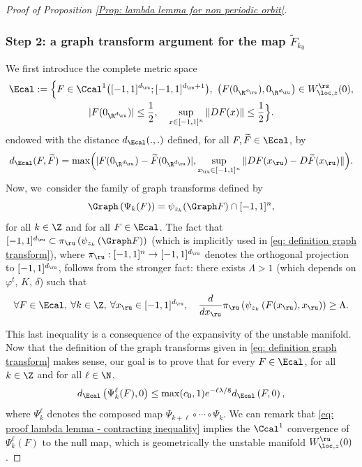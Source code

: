 \begin{appendix}
\begin{proof}[Proof of Proposition \ref{Prop: lambda lemma for non periodic orbit}]
\subsubsection*{Step 2: a graph transform argument for the map $\widetilde{F}_{k_0}$}
We first introduce the complete metric space
\begin{multline*}
\Ecal:= \Bigl\{ F \in \Ccal^{1} \bigl([-1,1]^{d_\ru}; [-1,1]^{d_\rs + 1} \bigr),\
\left(F(0_{\R^{d_\ru}}), 0_{\R^{d_\ru}} \right) \in W_{\loc,z}^\rs(0),\\
|F(0_{\R^{d_\ru}})| \leq \frac{1}{2}, \quad
\sup_{x \in [-1,1]^n} \|DF(x)\| \leq \frac{1}{2} \Bigr\}.
\end{multline*}
endowed with the distance $d_{\Ecal} (.,.)$ defined, for all $F, \widetilde{F} \in \Ecal$, by
\[
d_{\Ecal}(F, \widetilde{F}) = \max \Bigl(|F (0_{\R^{d_\ru}}) - \widetilde{F} (0_{\R^{d_\ru}})|, \sup_{x_\ru \in [-1,1]^n} \|DF (x_\ru) - D\widetilde{F} (x_\ru) \| \Bigr).
\]
Now, we~consider the family of graph transforms defined by
\begin{equation}\label{eq: definition graph transform}
\Graph \left(\Psi_k (F) \right) = \psi_{z_k} (\Graph F) \cap [-1, 1]^n,
\end{equation}
for all $ k \in \Z$ and for all $F \in \Ecal$. The fact that $[-1, 1]^{d_\ru} \subset \pi_\ru \left(\psi_{z_k} \left(\Graph F \right)\right)$ (which is implicitly used in \eqref{eq: definition graph transform}), where $\pi_\ru: [-1,1]^n \to [-1,1]^{d_\ru}$ denotes the orthogonal projection to $[-1,1]^{d_\ru}$, follows from the stronger fact: there exists $\Lambda > 1$ (which depends on $\varphi^t$, $K$, $\delta$) such that
\begin{equation}\label{eq: expansivity in the unstable direction}
\forall F \in \Ecal, \: \forall k \in \Z, \: \forall x_\ru \in [- 1, 1]^{d_\ru}, \quad \frac{d}{d x_\ru} \pi_\ru \left(\psi_{z_k} \left(F(x_\ru), x_\ru \right) \right) \geq \Lambda.
\end{equation}

This last inequality is a consequence of the expansivity of the unstable manifold. Now that the definition of the graph transforms given in \eqref{eq: definition graph transform} makes sense, our goal is to prove that for every $F \in \Ecal$, for all $k \in \Z$ and for all $\ell \in \N$,
\begin{equation}\label{eq: proof lambda lemma - contracting inequality}
d_{\Ecal} \left(\Psi_k^{\ell}(F), 0 \right) \leq \max (c_0, 1) e^{-\ell \lambda / 8} d_{\Ecal} \left(F, 0 \right),
\end{equation}
where $\Psi_k^{\ell}$ denotes the composed map $\Psi_{k + \ell} \circ \cdots \circ \Psi_{k}$.
We can remark that \eqref{eq: proof lambda lemma - contracting inequality} implies the $\Ccal^1$ convergence of $\Psi_k^{\ell}(F)$ to the null map, which is geometrically the unstable manifold $W_{\loc, z}^\ru (0)$.


\end{proof}
\end{appendix}
